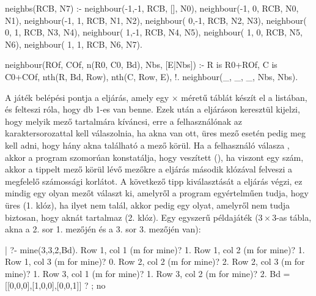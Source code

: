 \begin{prologcode}
neighbs(RCB, N7) :-
        neighbour(-1,-1, RCB, [], N0), 
        neighbour(-1, 0, RCB, N0, N1),
        neighbour(-1, 1, RCB, N1, N2), 
        neighbour( 0,-1, RCB, N2, N3),
        neighbour( 0, 1, RCB, N3, N4), 
        neighbour( 1,-1, RCB, N4, N5),
        neighbour( 1, 0, RCB, N5, N6), 
        neighbour( 1, 1, RCB, N6, N7).
\end{prologcode}
\begin{prologcode}
neighbour(ROf, COf, n(R0, C0, Bd), Nbs, [E|Nbs]) :-
        R is R0+ROf, C is C0+COf, 
        nth(R, Bd, Row), nth(C, Row, E), !.
neighbour(_, _, _, Nbs, Nbs).
\end{prologcode}

A játék belépési pontja a  eljárás, amely
egy  $\times$  méretű táblát készít el a 
listában, és felteszi róla, hogy  db 1-es van benne.
Ezek után a  eljáráson keresztül kijelzi, hogy melyik
mező tartalmára kíváncsi, erre a felhasználónak az  karaktersorozattal
kell válaszolnia, ha akna van ott, üres mező esetén pedig meg kell adni, hogy
hány akna található a mező körül. Ha a felhasználó válasza , akkor a
program szomorúan konstatálja, hogy veszített (), ha viszont egy
szám, akkor a tippelt mező körül lévő mezőkre a  eljárás
második klózával felveszi a megfelelő számossági korlátot. A következő tipp
kiválasztását a  eljárás végzi, ez mindig egy olyan mezőt
választ ki, amelyről a program egyértelműen tudja, hogy üres (1. klóz), ha ilyet
nem talál, akkor pedig egy olyat, amelyről nem tudja biztosan, hogy aknát tartalmaz
(2. klóz). Egy egyszerű példajáték ($3 \times 3$-as tábla, akna a 2. sor 1. mezőjén
és a 3. sor 3. mezőjén van):

\begin{prologcode}
| ?- mine(3,3,2,Bd).
Row 1, col 1 (m for mine)? 1.
Row 1, col 2 (m for mine)? 1.
Row 1, col 3 (m for mine)? 0.
Row 2, col 2 (m for mine)? 2.
Row 2, col 3 (m for mine)? 1.
Row 3, col 1 (m for mine)? 1.
Row 3, col 2 (m for mine)? 2.
Bd = [[0,0,0],[1,0,0],[0,0,1]] ? ;
no
\end{prologcode}

